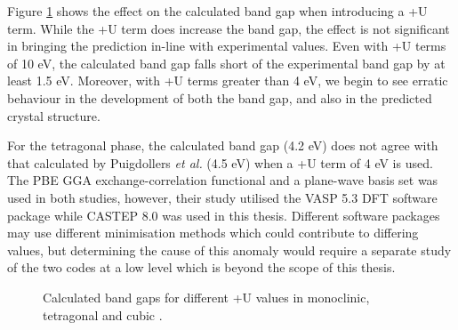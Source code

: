 Figure \ref{Figure:plusubandgap} shows the effect on the calculated band gap when introducing a +U term. While the +U term does increase the band gap, the effect is not significant in bringing the prediction in-line with experimental values. Even with +U terms of 10 eV, the calculated band gap falls short of the experimental band gap by at least 1.5 eV. Moreover, with +U terms greater than 4 eV, we begin to see erratic behaviour in the development of both the band gap, and also in the predicted crystal structure. 

For the tetragonal phase, the calculated band gap (4.2 eV) does not agree with that calculated by Puigdollers \emph{et al.} (4.5 eV) when a +U term of 4 eV is used\cite{RuizPuigdollers2016}. The PBE GGA exchange-correlation functional and a plane-wave basis set was used in both studies, however, their study utilised the VASP 5.3 DFT software package while CASTEP 8.0 was used in this thesis. Different software packages may use different minimisation methods which could contribute to differing values, but determining the cause of this anomaly would require a separate study of the two codes at a low level which is beyond the scope of this thesis.




\begin{figure}[ht] %
\begin{center}
		\caption{Calculated band gaps for different +U values in monoclinic, tetragonal and cubic \zirconia .}
		\label{Figure:plusubandgap}
	\end{center}
\end{figure}

